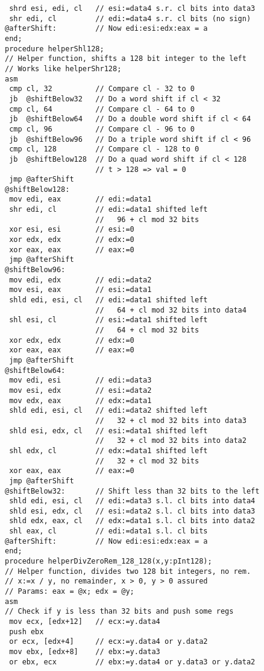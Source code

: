 \begin{multicols}{2}
{\begin{verbatim}
 shrd esi, edi, cl   // esi:=data4 s.r. cl bits into data3
 shr edi, cl         // edi:=data4 s.r. cl bits (no sign)
@afterShift:         // Now edi:esi:edx:eax = a
end;
procedure helperShl128;
// Helper function, shifts a 128 bit integer to the left
// Works like helperShr128;
asm
 cmp cl, 32          // Compare cl - 32 to 0
 jb  @shiftBelow32   // Do a word shift if cl < 32
 cmp cl, 64          // Compare cl - 64 to 0
 jb  @shiftBelow64   // Do a double word shift if cl < 64
 cmp cl, 96          // Compare cl - 96 to 0
 jb  @shiftBelow96   // Do a triple word shift if cl < 96
 cmp cl, 128         // Compare cl - 128 to 0
 jb  @shiftBelow128  // Do a quad word shift if cl < 128
                     // t > 128 => val = 0
 jmp @afterShift
@shiftBelow128:
 mov edi, eax        // edi:=data1
 shr edi, cl         // edi:=data1 shifted left
                     //   96 + cl mod 32 bits
 xor esi, esi        // esi:=0
 xor edx, edx        // edx:=0
 xor eax, eax        // eax:=0
 jmp @afterShift
@shiftBelow96:
 mov edi, edx        // edi:=data2
 mov esi, eax        // esi:=data1
 shld edi, esi, cl   // edi:=data1 shifted left
                     //   64 + cl mod 32 bits into data4
 shl esi, cl         // esi:=data1 shifted left
                     //   64 + cl mod 32 bits
 xor edx, edx        // edx:=0
 xor eax, eax        // eax:=0
 jmp @afterShift
@shiftBelow64:
 mov edi, esi        // edi:=data3
 mov esi, edx        // esi:=data2
 mov edx, eax        // edx:=data1
 shld edi, esi, cl   // edi:=data2 shifted left
                     //   32 + cl mod 32 bits into data3
 shld esi, edx, cl   // esi:=data1 shifted left
                     //   32 + cl mod 32 bits into data2
 shl edx, cl         // edx:=data1 shifted left
                     //   32 + cl mod 32 bits
 xor eax, eax        // eax:=0
 jmp @afterShift
@shiftBelow32:       // Shift less than 32 bits to the left
 shld edi, esi, cl   // edi:=data3 s.l. cl bits into data4
 shld esi, edx, cl   // esi:=data2 s.l. cl bits into data3
 shld edx, eax, cl   // edx:=data1 s.l. cl bits into data2
 shl eax, cl         // edi:=data1 s.l. cl bits
@afterShift:         // Now edi:esi:edx:eax = a
end;
procedure helperDivZeroRem_128_128(x,y:pInt128);
// Helper function, divides two 128 bit integers, no rem.
// x:=x / y, no remainder, x > 0, y > 0 assured
// Params: eax = @x; edx = @y;
asm
// Check if y is less than 32 bits and push some regs
 mov ecx, [edx+12]   // ecx:=y.data4
 push ebx
 or ecx, [edx+4]     // ecx:=y.data4 or y.data2
 mov ebx, [edx+8]    // ebx:=y.data3
 or ebx, ecx         // ebx:=y.data4 or y.data3 or y.data2

\end{verbatim}}
\end{multicols}
